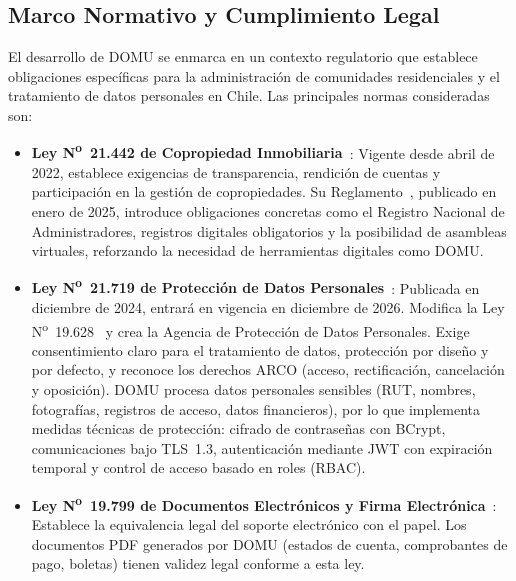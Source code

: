 

\subsection{Marco Normativo y Cumplimiento Legal}

El desarrollo de DOMU se enmarca en un contexto regulatorio que establece obligaciones específicas para la administración de comunidades residenciales y el tratamiento de datos personales en Chile. Las principales normas consideradas son:

\begin{itemize}
    \item \textbf{Ley N\textsuperscript{o}~21.442 de Copropiedad Inmobiliaria}~\cite{ley21442}: Vigente desde abril de 2022, establece exigencias de transparencia, rendición de cuentas y participación en la gestión de copropiedades. Su Reglamento~\cite{reglamento21442}, publicado en enero de 2025, introduce obligaciones concretas como el Registro Nacional de Administradores, registros digitales obligatorios y la posibilidad de asambleas virtuales, reforzando la necesidad de herramientas digitales como DOMU.

    \item \textbf{Ley N\textsuperscript{o}~21.719 de Protección de Datos Personales}~\cite{ley21719}: Publicada en diciembre de 2024, entrará en vigencia en diciembre de 2026. Modifica la Ley N\textsuperscript{o}~19.628~\cite{ley19628} y crea la Agencia de Protección de Datos Personales. Exige consentimiento claro para el tratamiento de datos, protección por diseño y por defecto, y reconoce los derechos ARCO (acceso, rectificación, cancelación y oposición). DOMU procesa datos personales sensibles (RUT, nombres, fotografías, registros de acceso, datos financieros), por lo que implementa medidas técnicas de protección: cifrado de contraseñas con BCrypt, comunicaciones bajo TLS~1.3, autenticación mediante JWT con expiración temporal y control de acceso basado en roles (RBAC).

    \item \textbf{Ley N\textsuperscript{o}~19.799 de Documentos Electrónicos y Firma Electrónica}~\cite{ley19799}: Establece la equivalencia legal del soporte electrónico con el papel. Los documentos PDF generados por DOMU (estados de cuenta, comprobantes de pago, boletas) tienen validez legal conforme a esta ley.
\end{itemize}

